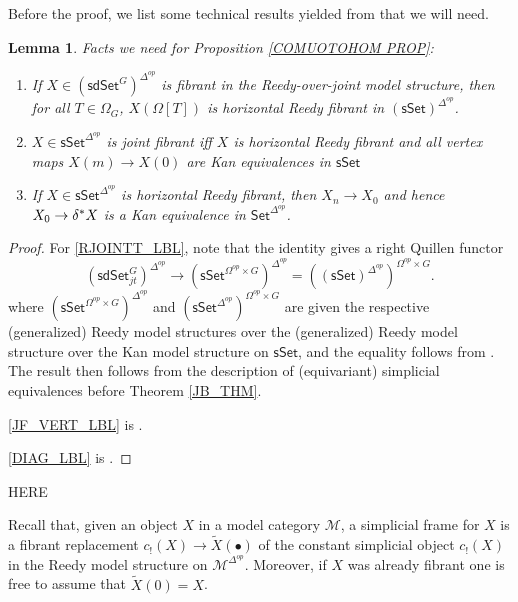 \documentclass[a4paper,10pt
,draft
]{article}%
\numberwithin{equation}{section}
\numberwithin{figure}{section}
\newtheorem{lemma}[equation]{Lemma}%
\theoremstyle{definition} %
\newcommand{\longto}{\longrightarrow}%
\newcommand{\sSet}{\ensuremath{\mathsf{sSet}}}%
\newcommand{\1}{\ensuremath{\mathbbm 1}}%
\begin{document}
Before the proof, we list some technical results yielded from \cite{BP_edss} that we will need.
\begin{lemma}
      \label{COMUOTOHOM_FACTS}
      Facts we need for Proposition \ref{COMUOTOHOM PROP}:
      \begin{enumerate}[label = (\roman*)]
      \item \label{RJOINTT_LBL} If $X \in (\mathsf{sdSet}^G)^{\Delta^{op}}$ is fibrant in the Reedy-over-joint model structure,
            then for all $T \in \Omega_G$, $X(\Omega[T])$ is horizontal Reedy fibrant in
            $(\mathsf{sSet})^{\Delta^{op}}$.
      \item \label{JF_VERT_LBL}
            $X \in \mathsf{sSet}^{\Delta^{op}}$ is joint fibrant iff
            $X$ is horizontal Reedy fibrant and all vertex maps $X(m) \to X(0)$ are Kan equivalences in $\mathsf{sSet}$
      \item \label{DIAG_LBL}
             If $X \in \mathsf{sSet}^{\Delta^{op}}$ is horizontal Reedy fibrant, then
             $X_n \to X_0$ and hence $X_0 \to \delta^{\**}X$ is a Kan equivalence in $\mathsf{Set}^{\Delta^{op}}$.
      \end{enumerate}
\end{lemma}
\begin{proof}
      For \ref{RJOINTT_LBL},
      note that the identity gives a right Quillen functor
      \[
            \left( \mathsf{sdSet}_{jt}^G \right)^{\Delta^{op}} \longto
            \left(\mathsf{sSet}^{\Omega^{op} \times G}\right)^{\Delta^{op}} =
            \left( (\mathsf{sSet})^{\Delta^{op}} \right)^{\Omega^{op} \times G}.
      \]
      where $\left(\sSet^{\Omega^{op} \times G}\right)^{\Delta^{op}}$ and $\left(\sSet^{\Delta^{op}}\right)^{\Omega^{op} \times G}$
      are given the respective (generalized) Reedy model structures over the (generalized) Reedy model structure
      over the Kan model structure on $\sSet$,
      and the equality follows from \cite[Remark A.31]{BP_edss}.
      The result then follows from the description of (equivariant) simplicial equivalences before Theorem \ref{JB_THM}.
      
      \ref{JF_VERT_LBL} is \cite[Prop. 4.24(ii)]{BP_edss}.

      \ref{DIAG_LBL} is \cite[Prop. 4.5(iv)]{BP_edss}.
\end{proof}


{\color{red} HERE}


Recall that, given an object $X$ in a model category $\mathcal{M}$,
a simplicial frame for $X$ is a fibrant replacement
$c_!(X) \to \widetilde{X}(\bullet)$ of the constant 
simplicial object $c_!(X)$ in the Reedy model structure on $\mathcal{M}^{\Delta^{op}}$.
Moreover, if $X$ was already fibrant one is free to assume that $\widetilde{X}(0) = X$.
\end{document}
